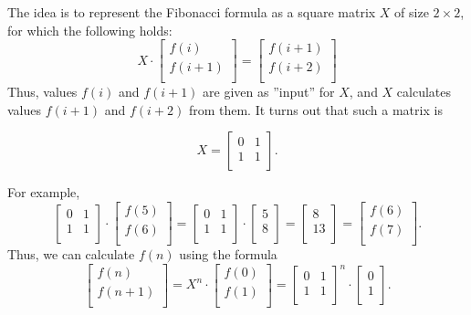 \begin{samepage}
The idea is to represent the
Fibonacci formula as a
square matrix $X$ of size $2 \times 2$,
for which the following holds:
\[ X \cdot
 \begin{bmatrix}
  f(i) \\
  f(i+1) \\
 \end{bmatrix}
=
 \begin{bmatrix}
  f(i+1) \\
  f(i+2) \\
 \end{bmatrix}
 \]
Thus, values $f(i)$ and $f(i+1)$ are given as
''input'' for $X$,
and $X$ calculates values $f(i+1)$ and $f(i+2)$
from them.
It turns out that such a matrix is

\[ X = 
 \begin{bmatrix}
  0 & 1 \\
  1 & 1 \\
 \end{bmatrix}.
\]
\end{samepage}
\noindent
For example,
\[
 \begin{bmatrix}
  0 & 1 \\
  1 & 1 \\
 \end{bmatrix}
\cdot
 \begin{bmatrix}
  f(5) \\
  f(6) \\
 \end{bmatrix}
=
 \begin{bmatrix}
  0 & 1 \\
  1 & 1 \\
 \end{bmatrix}
\cdot
 \begin{bmatrix}
  5 \\
  8 \\
 \end{bmatrix}
=
 \begin{bmatrix}
  8 \\
  13 \\
 \end{bmatrix}
=
 \begin{bmatrix}
  f(6) \\
  f(7) \\
 \end{bmatrix}.
\]
Thus, we can calculate $f(n)$ using the formula
\[
 \begin{bmatrix}
  f(n) \\
  f(n+1) \\
 \end{bmatrix}
=
X^n \cdot
 \begin{bmatrix}
  f(0) \\
  f(1) \\
 \end{bmatrix}
=
 \begin{bmatrix}
  0 & 1 \\
  1 & 1 \\
 \end{bmatrix}^n
\cdot
 \begin{bmatrix}
  0 \\
  1 \\
 \end{bmatrix}.
\]

